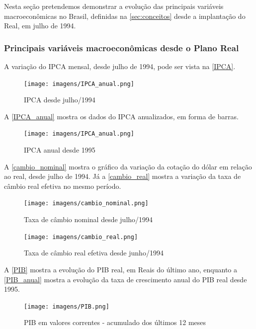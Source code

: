 \documentclass[]{article}
\begin{document}
Nesta seção pretendemos demonstrar a evolução das principais variáveis
macroeconômicas no Brasil, definidas na \autoref{sec:conceitos} desde a
implantação do Real, em julho de 1994.

\subsubsection{Principais variáveis macroeconômicas desde o Plano
Real}\label{principais-variaveis-macroeconomicas-desde-o-plano-real}

A variação do IPCA mensal, desde julho de 1994, pode ser vista na
\autoref{IPCA}.

\begin{figure}
\centering
\texttt{[image: imagens/IPCA\_anual.png]}
\caption{IPCA desde julho/1994}\label{IPCA}
\end{figure}

A \autoref{IPCA_anual} mostra os dados do IPCA anualizados, em forma de
barras.

\begin{figure}
\centering
\texttt{[image: imagens/IPCA\_anual.png]}
\caption{IPCA anual desde 1995}\label{IPCA_anual}
\end{figure}

A \autoref{cambio_nominal} mostra o gráfico da variação da cotação do
dólar em relação ao real, desde julho de 1994. Já a
\autoref{cambio_real} mostra a variação da taxa de câmbio real efetiva
no mesmo período.

\begin{figure}
\centering
\texttt{[image: imagens/cambio\_nominal.png]}
\caption{Taxa de câmbio nominal desde julho/1994}\label{cambio_nominal}
\end{figure}

\begin{figure}
\centering
\texttt{[image: imagens/cambio\_real.png]}
\caption{Taxa de câmbio real efetiva desde
junho/1994}\label{cambio_real}
\end{figure}

A \autoref{PIB} mostra a evolução do PIB real, em Reais do último ano,
enquanto a \autoref{PIB_anual} mostra a evolução da taxa de crescimento
anual do PIB real desde 1995.

\begin{figure}
\centering
\texttt{[image: imagens/PIB.png]}
\caption{PIB em valores correntes - acumulado dos últimos 12
meses}\label{PIB}
\end{figure}
\end{document}
